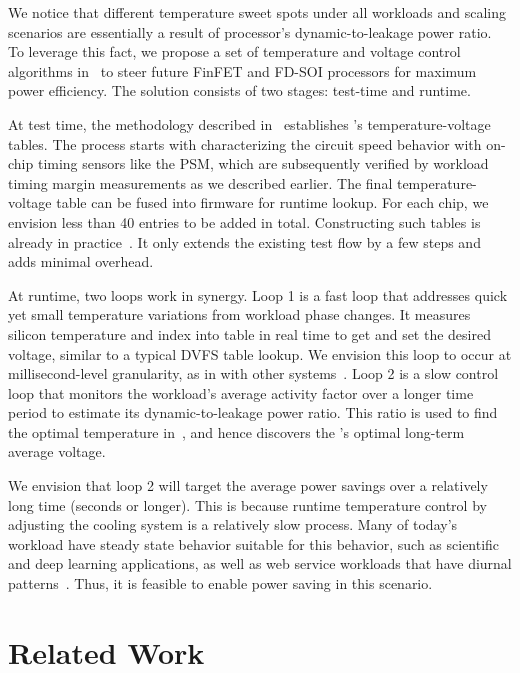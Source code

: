 We notice that different temperature sweet spots under all workloads and scaling scenarios are essentially a result of processor's dynamic-to-leakage power ratio. To leverage this fact, we propose a set of temperature and voltage control algorithms in~ to steer future FinFET and FD-SOI processors for maximum power efficiency. The solution consists of two stages: test-time and runtime.

At test time, the methodology described in~ establishes \tistate's temperature-voltage tables.  The process starts with characterizing the circuit speed behavior with on-chip timing sensors like the PSM, which are subsequently verified by workload timing margin measurements as we described earlier. The final temperature-voltage table can be fused into firmware for runtime lookup. For each chip, we envision less than 40 entries to be added in total. Constructing such tables is already in practice~\cite{sriram2016avfs}. It only extends the existing test flow by a few steps and adds minimal overhead.

At runtime, two loops work in synergy. Loop 1 is a fast loop that addresses quick yet small temperature variations from workload phase changes. It measures silicon temperature and index into \tistate table in real time to get and set the desired voltage, similar to a typical DVFS table lookup. We envision this loop to occur at millisecond-level granularity, as in with other systems~\cite{lefurgy2011active}. Loop 2 is a slow control loop that monitors the workload's average activity factor over a longer time period to estimate its dynamic-to-leakage power ratio. This ratio is used to find the optimal temperature in~, and hence discovers the \tistate's optimal long-term average voltage.

We envision that loop 2 will target the average power savings over a relatively long time (seconds or longer). This is because runtime temperature control by adjusting the cooling system is a relatively slow process. Many of today's workload have steady state behavior suitable for this behavior, such as scientific and deep learning applications, as well as web service workloads that have diurnal patterns~\cite{lo2014towards}. Thus, it is feasible to enable power saving in this scenario.

\section{Related Work}
\label{sec:temperature:related}

